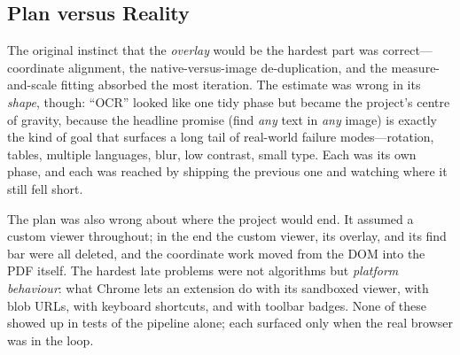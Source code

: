 \subsection{Plan versus Reality}
The original instinct that the \emph{overlay} would be the hardest part was
correct---coordinate alignment, the native-versus-image de-duplication, and the
measure-and-scale fitting absorbed the most iteration. The estimate was wrong in
its \emph{shape}, though: ``OCR'' looked like one tidy phase but became the
project's centre of gravity, because the headline promise (find \emph{any} text
in \emph{any} image) is exactly the kind of goal that surfaces a long tail of
real-world failure modes---rotation, tables, multiple languages, blur, low
contrast, small type. Each was its own phase, and each was reached by shipping
the previous one and watching where it still fell short.

The plan was also wrong about where the project would end. It assumed a custom
viewer throughout; in the end the custom viewer, its overlay, and its find bar
were all deleted, and the coordinate work moved from the DOM into the PDF itself.
The hardest late problems were not algorithms but \emph{platform behaviour}: what
Chrome lets an extension do with its sandboxed viewer, with blob URLs, with
keyboard shortcuts, and with toolbar badges. None of these showed up in tests of
the pipeline alone; each surfaced only when the real browser was in the loop.
